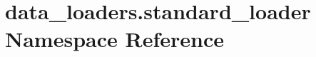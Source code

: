 \hypertarget{namespacedata__loaders_1_1standard__loader}{}\section{data\+\_\+loaders.\+standard\+\_\+loader Namespace Reference}
\label{namespacedata__loaders_1_1standard__loader}
